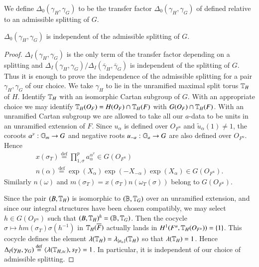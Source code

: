 \documentclass{amsart}
\newenvironment{cthm}[1]
  {\renewcommand\thethm{\bf #1}\thm}
  {\endthm}
\def\Def{\overset{\operatorname{def}}=}   %
\def\LANGLANDSO{21}
\begin{document}
We define $\Delta_0(\gamma_H,\gamma_G)$ to be the transfer
factor $\Delta_0(\gamma_H,\gamma_G)$ of \cite{\LANGLANDSO} defined
relative to an admissible splitting of $G$.

\begin{cthm}{Lemma 7.2}  $\Delta_0(\gamma_H,\gamma_G)$ is independent
of the admissible splitting of $G$.
\end{cthm}

\begin{proof}  $\Delta_I(\gamma_H,\gamma_G)$ is the only term
of the transfer factor depending on a splitting and
$\Delta_I(\gamma_H,\gamma_G)/\Delta_I(\overline\gamma_H,
\overline \gamma_G)$ is independent of the splitting of $G$.
Thus it is enough to prove the independence of the admissible
splitting for a pair $\gamma_H,\gamma_G$ of our choice.  We
take $\gamma_H$ to lie in the unramified maximal split torus $\Bbb T_H$ of $H$.
Identify $\Bbb T_H$ with an isomorphic Cartan subgroup of $G$.  With
an appropriate choice we may identify $\Bbb T_H(O_F) = H(O_F)\cap \Bbb T_H(F)$
with $G(O_F)\cap \Bbb T_H(F)$. 
With an unramified Cartan
subgroup we are allowed to take all our $a$-data to be units in an
unramified extension of $F$.  Since $u_\alpha$ is defined over
$O_{F^u}$ and $\tilde u_\alpha(1)\ne1$, the coroots $\alpha^v:\Bbb G_m\to G$
and negative roots $u_{-\alpha}:\Bbb G_a\to G$ are also defined
over $O_{F^u}$.  Hence \cite{\LANGLANDSO}	%
\begin{gather*}
x(\sigma_T)\Def\prod_{1,\sigma}^p
a_\alpha^{\alpha^v}\in G(O_{F^u})\\
n(\alpha)\Def\exp(X_\alpha)\exp(-X_{-\alpha})
\exp(X_\alpha)\in G(O_{F^u}).
\end{gather*}
Similarly $n(\omega)$ and $m(\sigma_T) = x(\sigma_T)n(\omega_T(\sigma))$ belong
to $G(O_{F^u})$.


Since the pair $(B,\Bbb T_H)$ is isomorphic to $(\Bbb B,\Bbb T_G)$ over
an unramified extension, and since our integral structures have been chosen
compatibly, 
we may select $h\in G(O_{F^u})$ such that 
$(B,\Bbb T_H)^h=(\Bbb B,\Bbb T_G)$.
Then the cocycle
$\sigma\mapsto hm(\sigma_T)\sigma(h^{-1})$
in $\Bbb T_H(\overline F)$ actually lands in 
$H^1(F^u,\Bbb T_H(O_{F^u}))=\{1\}$.  This cocycle
defines the element $\lambda(\Bbb T_H)=\lambda_{\{a_\alpha\}}(\Bbb T_H)$
so that 
$\lambda(\Bbb T_H) = 1$.  Hence
$\Delta_I(\gamma_H,\gamma_G)
\Def\langle\lambda(\Bbb T_{H,sc}),s_T\rangle=1$.  In particular,
it is independent of our choice of admissible splitting.
\end{proof}
\end{document}
